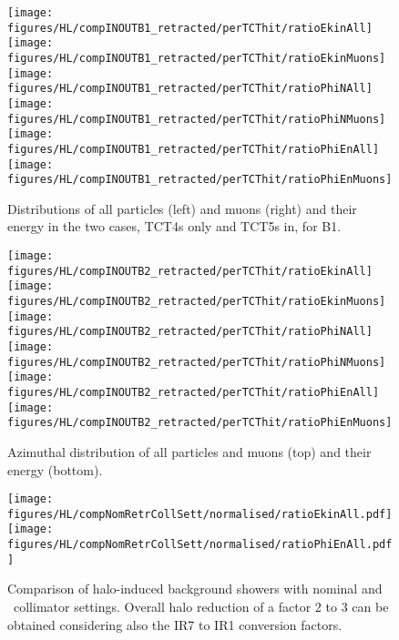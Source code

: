 \begin{figure}
\centering
\texttt{[image: figures/HL/compINOUTB1\_retracted/perTCThit/ratioEkinAll]}
\texttt{[image: figures/HL/compINOUTB1\_retracted/perTCThit/ratioEkinMuons]}
\texttt{[image: figures/HL/compINOUTB1\_retracted/perTCThit/ratioPhiNAll]}
\texttt{[image: figures/HL/compINOUTB1\_retracted/perTCThit/ratioPhiNMuons]}
\texttt{[image: figures/HL/compINOUTB1\_retracted/perTCThit/ratioPhiEnAll]}
\texttt{[image: figures/HL/compINOUTB1\_retracted/perTCThit/ratioPhiEnMuons]}
 \caption{Distributions of all particles (left) and muons (right) and their energy in the two cases, TCT4s only and TCT5s in, for B1.
  \label{fig:compInOutB1_perTCThit}}
\end{figure}




\begin{figure}
\begin{center}
\texttt{[image: figures/HL/compINOUTB2\_retracted/perTCThit/ratioEkinAll]}
\texttt{[image: figures/HL/compINOUTB2\_retracted/perTCThit/ratioEkinMuons]}
\texttt{[image: figures/HL/compINOUTB2\_retracted/perTCThit/ratioPhiNAll]}
\texttt{[image: figures/HL/compINOUTB2\_retracted/perTCThit/ratioPhiNMuons]}
\texttt{[image: figures/HL/compINOUTB2\_retracted/perTCThit/ratioPhiEnAll]}
\texttt{[image: figures/HL/compINOUTB2\_retracted/perTCThit/ratioPhiEnMuons]}
\end{center}
\vspace{-0.6cm}
 \caption{Azimuthal distribution of all particles and muons (top) and their energy (bottom).
  \label{fig:compInOutB2}}
\end{figure}


\begin{figure}
\centering
\texttt{[image: figures/HL/compNomRetrCollSett/normalised/ratioEkinAll.pdf]}
\texttt{[image: figures/HL/compNomRetrCollSett/normalised/ratioPhiEnAll.pdf]}
 \caption{Comparison of halo-induced background showers with nominal and \twosigmaret~collimator settings. Overall halo reduction of a factor 2 to 3 can be obtained considering also the IR7 to IR1 conversion factors\label{fig:compNomRetrSett2}.}
\end{figure}
